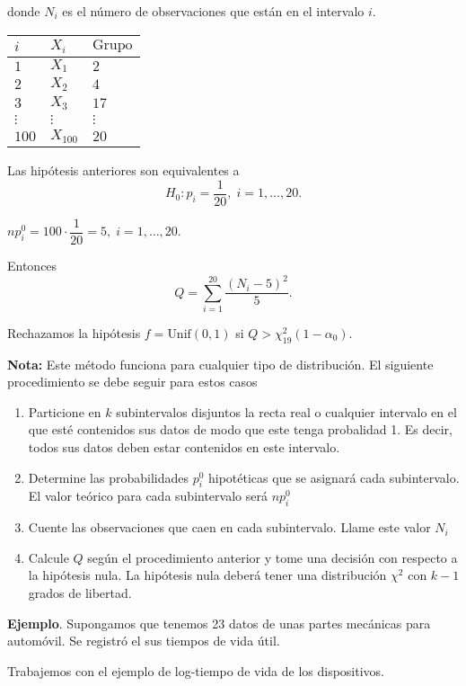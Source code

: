 \documentclass[
  12pt,
]{book}
\begin{document}
donde \(N_i\) es el número de observaciones que están en el intervalo \(i\).

\begin{longtable}[]{@{}lll@{}}
\toprule
\(i\) & \(X_i\) & \(\text{Grupo}\)\tabularnewline
\midrule
\endhead
\(1\) & \(X_1\) & \(2\)\tabularnewline
\(2\) & \(X_2\) & \(4\)\tabularnewline
\(3\) & \(X_3\) & \(17\)\tabularnewline
\(\vdots\) & \(\vdots\) & \(\vdots\)\tabularnewline
\(100\) & \(X_{100}\) & \(20\)\tabularnewline
\bottomrule
\end{longtable}

Las hipótesis anteriores son equivalentes a
\[H_0: p_i = \dfrac{1}{20}, \;i=1,\dots,20.\]

\(np_i^0 = 100\cdot\dfrac 1{20} = 5,\;i = 1,\dots,20\).

Entonces
\[Q = \sum_{i=1}^{20}\dfrac{(N_i-5)^2}{5}.\]

Rechazamos la hipótesis \(f = \text{Unif}(0,1)\) si \(Q>\chi^2_{19}(1-\alpha_0)\).

\textbf{Nota:} Este método funciona para cualquier tipo de distribución. El siguiente
procedimiento se debe seguir para estos casos

\begin{enumerate}
\def\labelenumi{\roman{enumi}.}
\item
  Particione en \(k\) subintervalos disjuntos la recta real o cualquier intervalo
  en el que esté contenidos sus datos de modo que este tenga probalidad 1. Es
  decir, todos sus datos deben estar contenidos en este intervalo.
\item
  Determine las probabilidades \(p_i ^{0}\) hipotéticas que se asignará cada
  subintervalo. El valor teórico para cada subintervalo será \(n p_i ^{0}\)
\item
  Cuente las observaciones que caen en cada subintervalo. Llame este valor \(N_i\)
\item
  Calcule \(Q\) según el procedimiento anterior y tome una decisión con respecto
  a la hipótesis nula. La hipótesis nula deberá tener una distribución \(\chi ^{2}\)
  con \(k-1\) grados de libertad.
\end{enumerate}

\textbf{Ejemplo}. Supongamos que tenemos 23 datos de unas partes mecánicas para automóvil. Se registró el sus tiempos de vida útil.

Trabajemos con el ejemplo de log-tiempo de vida de los dispositivos.
\end{document}
